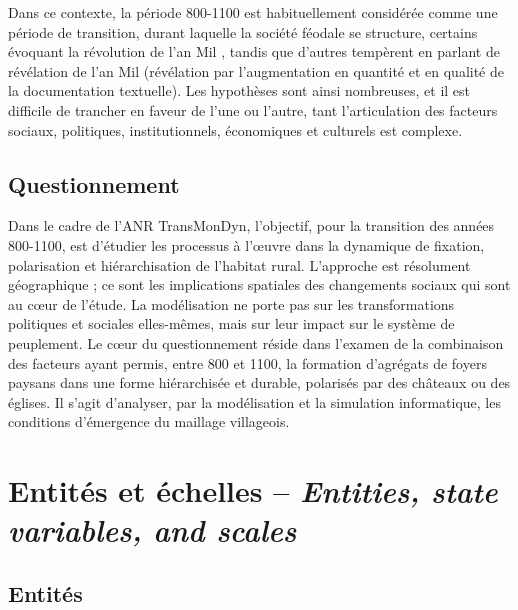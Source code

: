 {	Dans ce contexte, la période 800-1100 est habituellement considérée comme une période de transition, durant laquelle la société féodale se structure, certains évoquant la \og révolution de l'an Mil\fg{} \autocite{fossier_enfance_1982}, tandis que d'autres tempèrent en parlant de \og révélation de l'an Mil\fg{} \autocite{barthelemy_societe_1993} (\og révélation\fg{} par l'augmentation en quantité et en qualité de la documentation textuelle).
	Les hypothèses sont ainsi nombreuses, et il est difficile de trancher en faveur de l'une ou l'autre, tant l'articulation des facteurs sociaux, politiques, institutionnels, économiques et culturels est complexe.
}

\subsection{Questionnement}

{\redroman
	Dans le cadre de l'ANR TransMonDyn, l'objectif, pour la transition des années 800-1100, est d'étudier les processus à l'œuvre dans la dynamique de fixation, polarisation et hiérarchisation de l'habitat rural.
	L'approche est résolument géographique ; ce sont les implications spatiales des changements sociaux qui sont au cœur de l'étude.
	La modélisation ne porte pas sur les transformations politiques et sociales elles-mêmes, mais sur leur impact sur le système de peuplement.
	Le cœur du questionnement réside dans l'examen de la combinaison des facteurs ayant permis, entre 800 et 1100, la formation d'agrégats de foyers paysans dans une forme hiérarchisée et durable, polarisés par des châteaux ou des églises.
	Il s'agit d'analyser, par la modélisation et la simulation informatique, les conditions d'émergence du maillage villageois.
}

\let\orisectionmark\sectionmark
\renewcommand\sectionmark[1]{}%
\section[Entités et échelles -- \textit{Entities, state variables, and scales}]{Entités et échelles -- \large{\textit{Entities, state variables, and scales}}}
\orisectionmark{Entités et échelles}
\let\sectionmark\orisectionmark

\vspace{-.5em}
\subsection{Entités \label{subsec:entites}}


